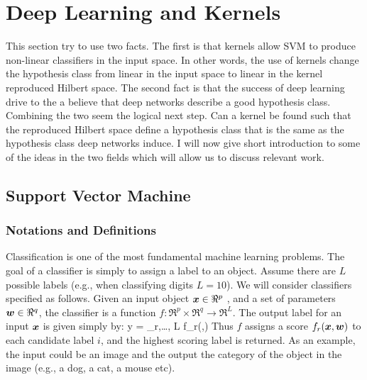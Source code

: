 \section{Deep Learning and Kernels}
This section try to use two facts.
The first is that kernels allow SVM to produce non-linear classifiers in the input space.
In other words, the use of kernels change the hypothesis class from linear in the input space to linear in the kernel reproduced Hilbert space.
The second fact is that the success of deep learning drive to the a believe that deep networks describe a good hypothesis class.
Combining the two seem the logical next step.
Can a kernel be found such that the reproduced Hilbert space define a hypothesis class that is the same as the hypothesis class deep networks induce.
I will now give short introduction to some of the ideas in the two fields which will allow us to discuss relevant work.
\subsection{Support Vector Machine}
\subsubsection{Notations and Definitions}
Classification is one of the most fundamental machine learning problems. The goal of a classifier is simply to assign a label to an object. Assume there are $L$ possible labels (e.g., when classifying digits $L=10$). We will consider classifiers specified as follows. Given an input object $\boldsymbol{x} \in \Re^p$ , and a set of parameters $\boldsymbol{w}\in\Re^q$, the classifier is a function $f: \Re^p \times \Re^q \to \Re^L$. The output label for an input $\boldsymbol{x}$ is given simply by:
\be
y = \arg\max_{r,\ldots, L} f_r(\xx,\ww)
\label{eq:argmax_classify}
\ee
Thus $f$ assigns a score $f_r(\boldsymbol{x},\boldsymbol{w})$ to each candidate label $i$, and the highest scoring label is returned.
As an example, the input could be an image and the output the category of the object in the image (e.g., a dog, a cat, a mouse etc). 



